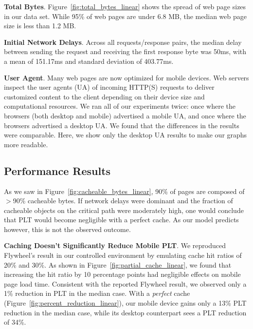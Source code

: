 \textbf{Total Bytes}. Figure~\ref{fig:total_bytes_linear} shows the spread of web page sizes in our data set. While 95\% of web pages are under 6.8 MB, the median web page size is less than 1.2 MB.

\textbf{Initial Network Delays}. Across all requests/response pairs, the median delay between sending the request and receiving the first response byte was 50ms, with a mean of 151.17ms and standard deviation of 403.77ms.

\textbf{User Agent}. Many web pages are now optimized for mobile devices. Web
servers inspect the user agents (UA) of incoming HTTP(S) requests to deliver
customized content to the client depending on their device size and
computational resources. We ran all of our experiments twice: once where the
browsers (both desktop and mobile) advertised a mobile UA, and once where the
browsers advertised a desktop UA. We found that the differences in the results
were comparable. Here, we show only the desktop UA results to make our graphs more readable.

\subsection{Performance Results}
As we saw in Figure~\ref{fig:cacheable_bytes_linear}, 90\% of pages are
composed of $>$90\% cacheable bytes.
If network delays were dominant and the fraction of cacheable objects on the
critical path were moderately high, one would conclude that PLT would become negligible with a perfect cache. As our model predicts however, this is not the observed outcome.

\textbf{Caching Doesn't Significantly Reduce Mobile PLT}.
We reproduced Flywheel's result in our controlled environment by emulating cache hit ratios of 20\% and 30\%. As shown in Figure~\ref{fig:partial_cache_linear}, we found that increasing the hit ratio by 10 percentage points had negligible effects on mobile page load time. Consistent with the reported Flywheel result, we observed only a 1\% reduction in PLT in the median case.
With a {\em perfect} cache (Figure~\ref{fig:percent_reduction_linear}), our mobile device gains only a 13\% PLT reduction
in the median case, while its desktop counterpart sees a PLT reduction of
34\%.

